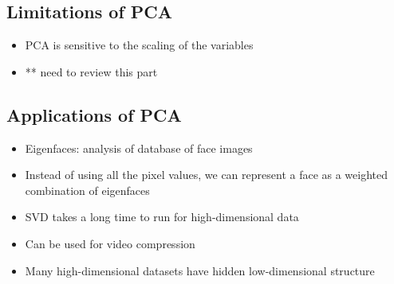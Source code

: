 \documentclass[../main.tex]{subfiles}
\begin{document}
    \subsection{Limitations of PCA}
    \begin{itemize}
        \item PCA is sensitive to the scaling of the variables
        \item ** need to review this part
    \end{itemize}
    \subsection{Applications of PCA}
    \begin{itemize}
        \item Eigenfaces: analysis of database of face images
        \item Instead of using all the pixel values, we can represent a face as a weighted combination of eigenfaces
        \item SVD takes a long time to run for high-dimensional data
        \item Can be used for video compression
        \item Many high-dimensional datasets have hidden low-dimensional structure
    \end{itemize}
\end{document}

